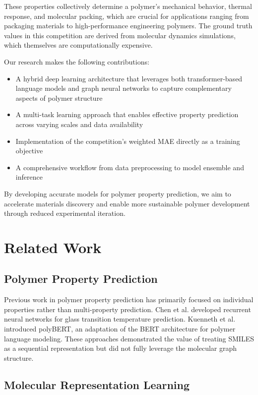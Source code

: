 \documentclass[10pt,twocolumn,letterpaper]{article}
\begin{document}
These properties collectively determine a polymer's mechanical behavior, thermal response, and molecular packing, which are crucial for applications ranging from packaging materials to high-performance engineering polymers. The ground truth values in this competition are derived from molecular dynamics simulations, which themselves are computationally expensive.

Our research makes the following contributions:
\begin{itemize}
    \item A hybrid deep learning architecture that leverages both transformer-based language models and graph neural networks to capture complementary aspects of polymer structure
    \item A multi-task learning approach that enables effective property prediction across varying scales and data availability
    \item Implementation of the competition's weighted MAE directly as a training objective
    \item A comprehensive workflow from data preprocessing to model ensemble and inference
\end{itemize}

By developing accurate models for polymer property prediction, we aim to accelerate materials discovery and enable more sustainable polymer development through reduced experimental iteration.

\section{Related Work}

\subsection{Polymer Property Prediction}

Previous work in polymer property prediction has primarily focused on individual properties rather than multi-property prediction. Chen et al. \cite{chen2019} developed recurrent neural networks for glass transition temperature prediction. Kuenneth et al. \cite{kuenneth2021} introduced polyBERT, an adaptation of the BERT architecture for polymer language modeling. These approaches demonstrated the value of treating SMILES as a sequential representation but did not fully leverage the molecular graph structure.

\subsection{Molecular Representation Learning}
\end{document}

